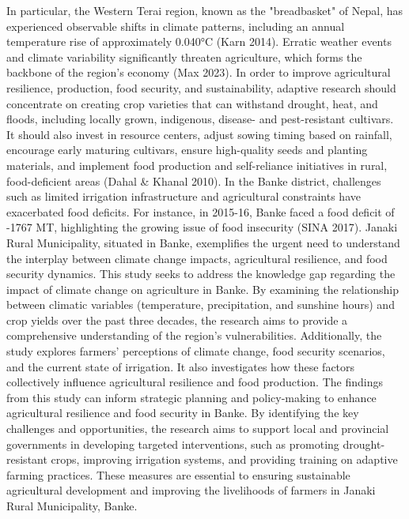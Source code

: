 In particular, the Western Terai region, known as the "breadbasket" of Nepal, has experienced observable shifts in climate patterns, including an annual temperature rise of approximately 0.040°C (Karn 2014). Erratic weather events and climate variability significantly threaten agriculture, which forms the backbone of the region's economy (Max 2023).  In order to improve agricultural resilience, production, food security, and sustainability, adaptive research should concentrate on creating crop varieties that can withstand drought, heat, and floods, including locally grown, indigenous, disease- and pest-resistant cultivars. It should also invest in resource centers, adjust sowing timing based on rainfall, encourage early maturing cultivars, ensure high-quality seeds and planting materials, and implement food production and self-reliance initiatives in rural, food-deficient areas (Dahal \& Khanal 2010).
In the Banke district, challenges such as limited irrigation infrastructure and agricultural constraints have exacerbated food deficits. For instance, in 2015-16, Banke faced a food deficit of -1767 MT, highlighting the growing issue of food insecurity (SINA 2017). Janaki Rural Municipality, situated in Banke, exemplifies the urgent need to understand the interplay between climate change impacts, agricultural resilience, and food security dynamics. 
This study seeks to address the knowledge gap regarding the impact of climate change on agriculture in Banke. By examining the relationship between climatic variables (temperature, precipitation, and sunshine hours) and crop yields over the past three decades, the research aims to provide a comprehensive understanding of the region's vulnerabilities. Additionally, the study explores farmers' perceptions of climate change, food security scenarios, and the current state of irrigation. It also investigates how these factors collectively influence agricultural resilience and food production.
The findings from this study can inform strategic planning and policy-making to enhance agricultural resilience and food security in Banke. By identifying the key challenges and opportunities, the research aims to support local and provincial governments in developing targeted interventions, such as promoting drought-resistant crops, improving irrigation systems, and providing training on adaptive farming practices. These measures are essential to ensuring sustainable agricultural development and improving the livelihoods of farmers in Janaki Rural Municipality, Banke.
